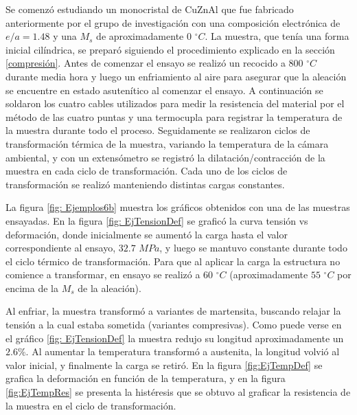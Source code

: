 \documentclass[a4paper,12pt,fleqn,twoside,openany]{book}
\begin{document}
Se comenzó estudiando un monocristal de CuZnAl que fue fabricado anteriormente por el grupo de investigación con una composición electrónica de $e/a=1.48$ y una $M_s$ de aproximadamente $0$ $^\circ C$. La muestra, que tenía una forma inicial cilíndrica, se preparó siguiendo el procedimiento explicado en la sección \ref{compresión}. Antes de comenzar el ensayo se realizó un recocido a $800$ $ ^\circ C$ durante media hora y luego un enfriamiento al aire para asegurar que la aleación se encuentre en estado asutenítico al comenzar el ensayo. A continuación se soldaron los cuatro cables utilizados para medir la resistencia del material por el método de las cuatro puntas y una termocupla para registrar la temperatura de la muestra durante todo el proceso. Seguidamente se realizaron ciclos de transformación térmica de la muestra, variando la temperatura de la cámara ambiental, y con un extensómetro se registró la dilatación/contracción de la muestra en cada ciclo de transformación. Cada uno de los ciclos de transformación se realizó manteniendo distintas cargas constantes. 

La figura \ref{fig: Ejemplos6b} muestra los gráficos obtenidos con una de las muestras ensayadas. En la figura \ref{fig: EjTensionDef} se graficó la curva tensión vs deformación, donde inicialmente se aumentó la carga hasta el valor correspondiente al ensayo, $32.7$ $MPa$, y luego se mantuvo constante durante todo el ciclo térmico de transformación. Para que al aplicar la carga la estructura no comience a transformar, en ensayo se realizó a $60$ $^\circ C$ (aproximadamente $55$ $^\circ C$ por encima de la $M_s$ de la aleación).  


Al enfriar, la muestra transformó a variantes de martensita, buscando relajar la tensión a la cual estaba sometida (variantes compresivas). Como puede verse en el gráfico \ref{fig: EjTensionDef} la muestra redujo su longitud aproximadamente un $2.6\%$. Al aumentar la temperatura transformó a austenita, la longitud volvió al valor inicial, y finalmente la carga se retiró. En la figura \ref{fig:EjTempDef} se grafica la deformación en función de la temperatura, y en la figura \ref{fig:EjTempRes} se presenta la histéresis que se obtuvo al graficar la resistencia de la muestra en el ciclo de transformación. 

\end{document}
